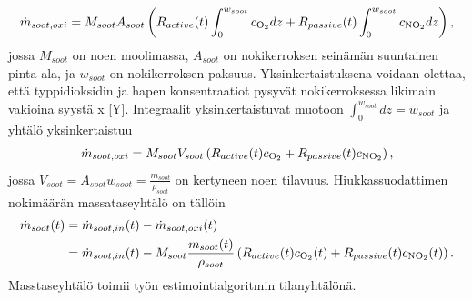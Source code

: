 \begin{align}
    \dot{m}_{soot, oxi} = M_{soot} A_{soot}\left(R_{active}(t) \int_0^{w_{soot}} c_{\ce{O2}} dz +
                 R_{passive}(t) \int_0^{w_{soot}} c_{\ce{NO2}} dz
    \right),
\end{align}
jossa \(M_{soot}\) on noen moolimassa, \(A_{soot}\) on nokikerroksen seinämän suuntainen pinta-ala, ja \(w_{soot}\) on nokikerroksen paksuus. Yksinkertaistuksena  voidaan olettaa, että typpidioksidin ja hapen konsentraatiot pysyvät nokikerroksessa likimain vakioina {\color{red} syystä x [Y]}. 
Integraalit yksinkertaistuvat muotoon 
\(\int_0^{w_{soot}} dz = w_{soot}\)
ja yhtälö yksinkertaistuu 
\begin{align}
    \dot{m}_{soot, oxi} = M_{soot}V_{soot} \left( R_{active}(t)
    c_{\ce{O2}} + R_{passive}(t)c_{\ce{NO2}} \right),
\end{align}
jossa \(V_{soot}=A_{soot}w_{soot} = \frac{m_{soot}}{ \rho_{soot}}\) on kertyneen noen tilavuus.
Hiukkassuodattimen nokimäärän massataseyhtälö on tällöin
\begin{align}\label{eq:tilanyhtalo_noki}
\begin{split}
    \dot{m} _{soot}(t) &= \dot{m} _{soot, in}(t) - \dot{m} _{soot, oxi}(t)
    \\ & = \dot{m}_{soot, in}(t) - M_{soot} \frac{m_{soot}(t)}{ \rho_{soot}}\left( R_{active}(t)c_{\ce{O2}}(t) + R_{passive}(t)c_{\ce{NO2}}(t)\right).
\end{split}
\end{align}
Masstaseyhtälö toimii työn estimointialgoritmin tilanyhtälönä.

